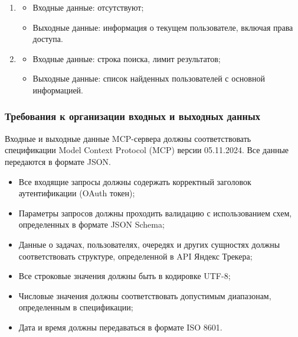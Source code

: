\documentclass[utf8, russian]{eskdtext}
\begin{document}
\begin{enumerate}
    \item {}
    \begin{itemize}
        \item Входные данные: отсутствуют;
        \item Выходные данные: информация о текущем пользователе, включая права доступа.
    \end{itemize}
    
    \item {}
    \begin{itemize}
        \item Входные данные: строка поиска, лимит результатов;
        \item Выходные данные: список найденных пользователей с основной информацией.
    \end{itemize}
\end{enumerate}

\subsubsection{Требования к организации входных и выходных данных}

Входные и выходные данные MCP-сервера должны соответствовать спецификации Model Context Protocol (MCP) версии  05.11.2024. Все данные передаются в формате JSON.

\begin{itemize}
    \item Все входящие запросы должны содержать корректный заголовок аутентификации (OAuth токен);
    \item Параметры запросов должны проходить валидацию с использованием схем, определенных в формате JSON Schema;
    \item Данные о задачах, пользователях, очередях и других сущностях должны соответствовать структуре, определенной в API Яндекс Трекера;
    \item Все строковые значения должны быть в кодировке UTF-8;
    \item Числовые значения должны соответствовать допустимым диапазонам, определенным в спецификации;
    \item Дата и время должны передаваться в формате ISO 8601.
\end{itemize}
\end{document}
